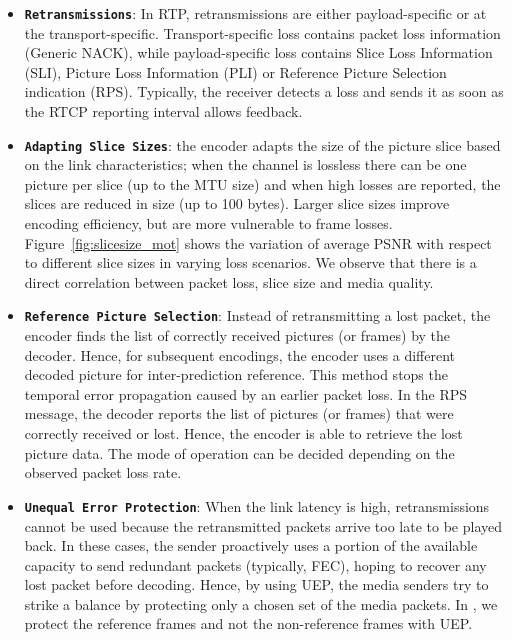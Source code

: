 \begin{itemize}
\setlength{\itemsep}{0pt}

  \item \textbf{\texttt{Retransmissions}}: In RTP, retransmissions are either
  payload-specific or at the transport-specific. Transport-specific loss
  contains packet loss information (Generic NACK), while payload-specific loss
  contains Slice Loss Information (SLI), Picture Loss Information (PLI) or
  Reference Picture Selection indication (RPS). Typically, the receiver
  detects a loss and sends it as soon as the RTCP reporting interval allows
  feedback.

  \item \textbf{\texttt{Adapting Slice Sizes}}: the encoder adapts the size of
  the picture slice based on the link characteristics; when the channel is
  lossless there can be one picture per slice (up to the MTU size) and when
  high losses are reported, the slices are reduced in size (up to 100 bytes).
  Larger slice sizes improve encoding efficiency, but are more vulnerable to
  frame losses. Figure~\ref{fig:slicesize_mot} shows the variation of average
  PSNR with respect to different slice sizes in varying loss scenarios. We
  observe that there is a direct correlation between packet loss, slice
  size and media quality.

  \item \textbf{\texttt{Reference Picture Selection}}: Instead of
  retransmitting a lost packet, the encoder finds the list of correctly
  received pictures (or frames) by the decoder. Hence, for subsequent encodings, the
  encoder uses a different decoded picture for inter-prediction reference.
  This method stops the temporal error propagation caused by an earlier packet
  loss. In the RPS message, the decoder reports the list of pictures (or frames)
  that were correctly received or lost. Hence, the encoder is able to retrieve
  the lost picture data. The mode of operation can be decided
  depending on the observed packet loss rate.

  \item \textbf{\texttt{Unequal Error Protection}}: When the link latency is
  high, retransmissions cannot be used because the
  retransmitted packets arrive too late to be played back. In these cases, the
  sender proactively uses a portion of the available capacity to send
  redundant packets (typically, FEC), hoping to recover any lost packet before
  decoding. Hence, by using UEP, the media senders try to strike a balance by
  protecting only a chosen set of the media packets. In , we
  protect the reference frames and not the non-reference frames with UEP.

\end{itemize}


